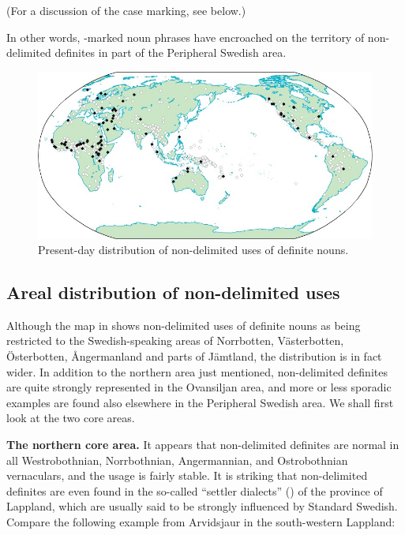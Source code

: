 \z

(For a discussion of the case marking, see  below.) 

In other words, -marked noun phrases have encroached on the territory of non-delimited definites in part of the Peripheral Swedish area. 

\begin{figure}[h]
\includegraphics{figures_mod/image11}
\caption{Present-day distribution of non-delimited uses of definite nouns.}
\label{map:11}

\end{figure}

\subsection{ Areal distribution of non-delimited uses}

Although the map in \citet{Delsing2003a} shows non-delimited uses of definite nouns as being restricted to the Swedish-speaking areas of Norrbotten, Västerbotten, Österbotten, Ångermanland and parts of Jämtland, the distribution is in fact wider. In addition to the northern area just mentioned, non-delimited definites are quite strongly represented in the Ovansiljan area, and more or less sporadic examples are found also elsewhere in the Peripheral Swedish area. We shall first look at the two core areas.

\textbf{The northern core area. }It appears that non-delimited definites are normal in all Westrobothnian, Norrbothnian, Angermannian, and Ostrobothnian vernaculars, and the usage is fairly stable. It is striking that non-delimited definites are even found in the so-called “settler dialects” () of the province of Lappland, which are usually said to be strongly influenced by Standard Swedish. Compare the following example from Arvidsjaur in the south-western Lappland:

